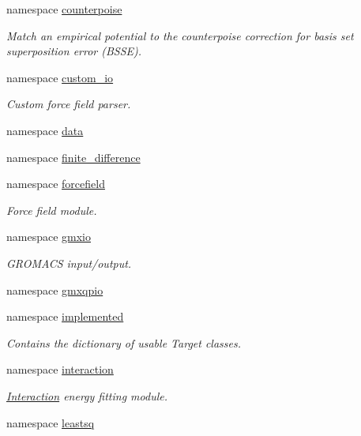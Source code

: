 \begin{DoxyCompactItemize}
\item 
namespace \hyperlink{namespaceforcebalance_1_1counterpoise}{counterpoise}
\begin{DoxyCompactList}\small\item\em \-Match an empirical potential to the counterpoise correction for basis set superposition error (\-B\-S\-S\-E). \end{DoxyCompactList}\item 
namespace \hyperlink{namespaceforcebalance_1_1custom__io}{custom\-\_\-io}
\begin{DoxyCompactList}\small\item\em \-Custom force field parser. \end{DoxyCompactList}\item 
namespace \hyperlink{namespaceforcebalance_1_1data}{data}
\item 
namespace \hyperlink{namespaceforcebalance_1_1finite__difference}{finite\-\_\-difference}
\item 
namespace \hyperlink{namespaceforcebalance_1_1forcefield}{forcefield}
\begin{DoxyCompactList}\small\item\em \-Force field module. \end{DoxyCompactList}\item 
namespace \hyperlink{namespaceforcebalance_1_1gmxio}{gmxio}
\begin{DoxyCompactList}\small\item\em \-G\-R\-O\-M\-A\-C\-S input/output. \end{DoxyCompactList}\item 
namespace \hyperlink{namespaceforcebalance_1_1gmxqpio}{gmxqpio}
\item 
namespace \hyperlink{namespaceforcebalance_1_1implemented}{implemented}
\begin{DoxyCompactList}\small\item\em \-Contains the dictionary of usable \-Target classes. \end{DoxyCompactList}\item 
namespace \hyperlink{namespaceforcebalance_1_1interaction}{interaction}
\begin{DoxyCompactList}\small\item\em \hyperlink{classforcebalance_1_1interaction_1_1Interaction}{\-Interaction} energy fitting module. \end{DoxyCompactList}\item 
namespace \hyperlink{namespaceforcebalance_1_1leastsq}{leastsq}
\item 

\end{DoxyCompactItemize}
